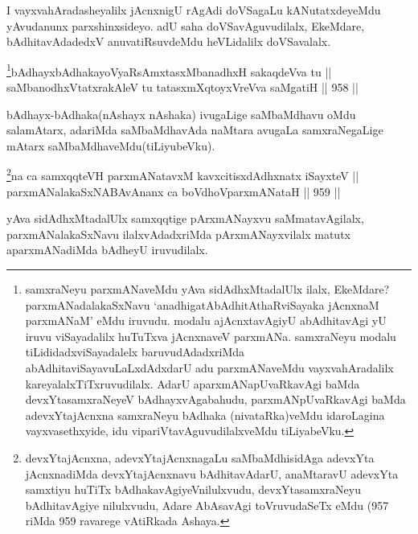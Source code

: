 \begin{artha}
I vayxvahAradasheyalilx jAcnxnigU rAgAdi doVSagaLu kANutatxdeyeMdu yAvudanunx parxshinxsideyo. adU saha doVSavAguvudilalx, EkeMdare, bAdhitavAdadedxV anuvatiRsuvdeMdu heVLidalilx doVSavalalx.
\end{artha}



\begin{shl}
\footnote{samxraNeyu parxmANaveMdu yAva sidAdhxMtadalUlx ilalx, EkeMdare? parxmANadalakaSxNavu `anadhigatAbAdhitAthaRviSayaka jAcnxnaM parxmANaM' eMdu iruvudu. modalu ajAcnxtavAgiyU abAdhitavAgi yU iruvu viSayadalilx huTuTxva jAcnxnaveV parxmANa. samxraNeyu modalu tiLididadxviSayadalelx baruvudAdadxriMda abAdhitaviSayavuLaLxdAdxdarU adu parxmANaveMdu vayxvahAradalilx kareyalalxTiTxruvudilalx. AdarU aparxmANapUvaRkavAgi baMda devxYtasamxraNeyeV bAdhayxvAgabahudu, parxmANpUvaRkavAgi baMda adevxYtajAcnxna samxraNeyu bAdhaka (nivataRka)veMdu idaroLagina vayxvasethxyide, idu vipariVtavAguvudilalxveMdu tiLiyabeVku.}bAdhayxbAdhakayoVyaRsAmxtasxMbanadhxH sakaqdeVva tu || \\
saMbanodhxVtatxrakAleV tu tatasxmXqtoyxVreVva saMgatiH \hfill || 958 ||  
\end{shl}

\begin{artha}
bAdhayx-bAdhaka(nAshayx nAshaka) ivugaLige saMbaMdhavu oMdu salamAtarx, adariMda saMbaMdhavAda naMtara avugaLa samxraNegaLige mAtarx saMbaMdhaveMdu(tiLiyubeVku).
\end{artha}



\begin{shl}
\footnote{devxYtajAcnxna, adevxYtajAcnxnagaLu saMbaMdhisidAga adevxYta jAcnxnadiMda devxYtajAcnxnavu bAdhitavAdarU, anaMtaravU adevxYta samxtiyu huTiTx bAdhakavAgiyeVnilulxvudu, devxYtasamxraNeyu bAdhitavAgiye nilulxvudu, Adare AbAsavAgi toVruvudaSeTx eMdu (957 riMda 959 ravarege vAtiRkada Ashaya.}na ca samxqqteVH parxmANatavxM kavxcitisxdAdhxnatx iSayxteV ||  \\
parxmANalakaSxNABAvAnanx ca boVdhoV\s parxmANataH \hfill || 959 ||  
\end{shl}

\begin{artha}
yAva sidAdhxMtadalUlx samxqqtige pArxmANayxvu saMmatavAgilalx, parxmANalakaSxNavu ilalxvAdadxriMda pArxmANayxvilalx matutx aparxmANadiMda bAdheyU iruvudilalx.
\end{artha}

